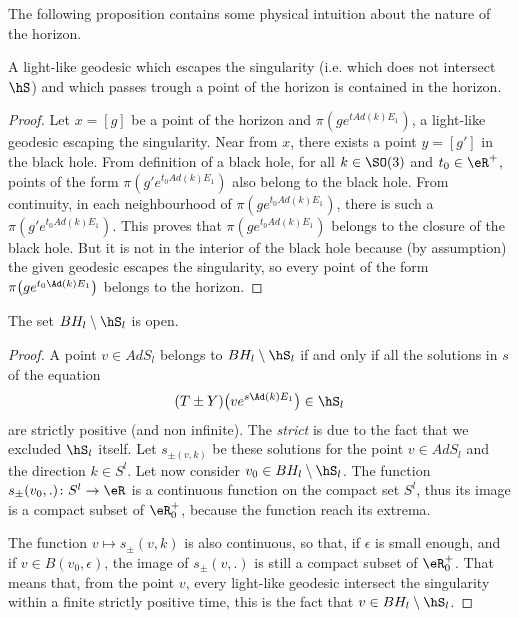 The following proposition contains some physical intuition about the nature of the horizon.

\begin{proposition}
	A light-like geodesic which escapes the singularity (i.e. which does not intersect $\hS$) and which passes trough a point of the horizon is contained in the horizon.
\end{proposition}

\begin{proof}
	Let $x=[g]$ be a point of the horizon and $\pi(ge^{tAd(k)E_1})$, a light-like geodesic escaping the singularity. Near from $x$, there exists a point $y=[g']$ in the black hole. From definition of a black hole, for all $k\in \SO(3)$ and $t_{0}\in\eR^{+}$, points of the form  $\pi(g'e^{t_0Ad(k)E_1})$ also belong to the black hole. From continuity, in each neighbourhood of $\pi(ge^{t_0Ad(k)E_1})$, there is such a $\pi(g'e^{t_0Ad(k)E_1})$. This proves that $\pi(ge^{t_0Ad(k)E_1})$ belongs to the closure of the black hole. But it is not in the interior of the black hole because (by assumption) the given geodesic escapes the singularity, so every point of the form $\pi\big( g e^{t_0\Ad(k)E_1} \big)$ belongs to the horizon.
\end{proof}

\begin{proposition}		\label{PropTNFerme}
	The set $BH_l\setminus\hS_l$ is open.
\end{proposition}

\begin{proof}
	A point $v\in AdS_l$ belongs to $BH_l\setminus\hS_l$ if and only if all  the solutions in $s$ of the equation
	\begin{equation}
		(T\pm Y)\big( v e^{s\Ad(k)E_1} \big)\in\hS_l
	\end{equation}
	are strictly positive (and non infinite). The \emph{strict} is due to the fact that we excluded $\hS_l$ itself. Let $s_{\pm(v,k)}$ be these solutions for the point $v\in AdS_l$ and the direction $k\in S^l$. Let now consider $v_0\in BH_l\setminus\hS_l$. The function $s_{\pm}(v_0,.)\colon S^l\to \eR$ is a continuous function on the compact set $S^l$, thus its image is a compact subset of $\eR_0^+$, because the function reach its extrema.

	The function $v\mapsto s_{\pm}(v,k)$ is also continuous, so that, if $\epsilon$ is small enough, and if $v\in B(v_0,\epsilon)$, the image of $s_{\pm}(v,.)$ is still a compact subset of $\eR_0^+$. That means that, from the point $v$, every light-like geodesic intersect the singularity within a finite strictly positive time, this is the fact that $v\in BH_l\setminus\hS_l$.
\end{proof}

